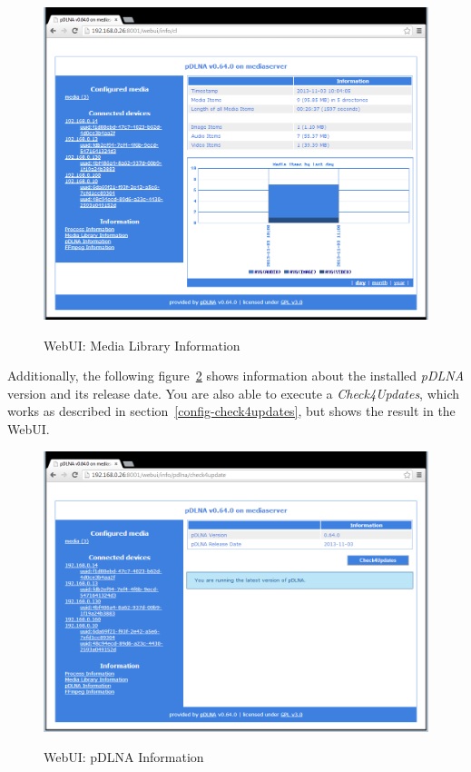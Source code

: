 \documentclass[a4paper,oneside,10pt]{report}
\begin{document}
\begin{figure}
	\centering
		\includegraphics[width=34em]{images/webui_info_library}
	\label{fig:webgui-library}
	\caption{WebUI: Media Library Information}
\end{figure}

Additionally, the following figure~\ref{fig:webgui-pdlna} shows information about the installed {\em pDLNA} version and its release date. You are also able to execute a {\em Check4Updates}, which works as described in section~\ref{config-check4updates}, but shows the result in the WebUI.

\begin{figure}
	\centering
		\includegraphics[width=34em]{images/webui_info_pdlna}
	\label{fig:webgui-pdlna}
	\caption{WebUI: pDLNA Information}
\end{figure}
\end{document}
